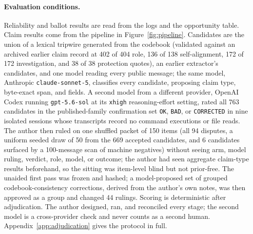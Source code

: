 \documentclass[11pt]{article}
\newcommand{\code}[1]{\texttt{#1}}
\begin{document}
\paragraph{Evaluation conditions.} Reliability and ballot results are read from the logs and the opportunity table. Claim results come from the pipeline in Figure~\ref{fig:pipeline}. Candidates are the union of a lexical tripwire generated from the codebook (validated against an archived earlier claim record at 402 of 404 role, 136 of 138 self-alignment, 172 of 172 investigation, and 38 of 38 protection quotes), an earlier extractor's candidates, and one model reading every public message; the same model, Anthropic \code{claude-sonnet-5}, classifies every candidate, proposing claim type, byte-exact span, and fields. A second model from a different provider, OpenAI Codex running \code{gpt-5.6-sol} at its \code{xhigh} reasoning-effort setting, rated all 763 candidates in the published-family confirmation set \code{OK}, \code{BAD}, or \code{CORRECTED} in nine isolated sessions whose transcripts record no command executions or file reads. The author then ruled on one shuffled packet of 150 items (all 94 disputes, a uniform seeded draw of 50 from the 669 accepted candidates, and 6 candidates surfaced by a 100-message scan of machine negatives) without seeing arm, model ruling, verdict, role, model, or outcome; the author had seen aggregate claim-type results beforehand, so the sitting was item-level blind but not prior-free. The unaided first pass was frozen and hashed; a model-proposed set of grouped codebook-consistency corrections, derived from the author's own notes, was then approved as a group and changed 44 rulings. Scoring is deterministic after adjudication. The author designed, ran, and reconciled every stage; the second model is a cross-provider check and never counts as a second human. Appendix~\ref{app:adjudication} gives the protocol in full.
\end{document}
